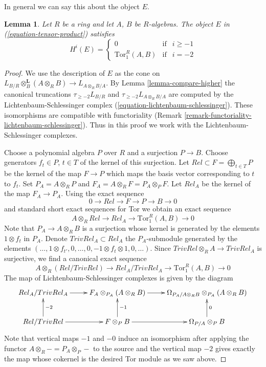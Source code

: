\documentclass{stacks-project}
\theoremstyle{plain}
\newtheorem{lemma}[subsection]{Lemma}
\theoremstyle{definition}
\theoremstyle{remark}
\numberwithin{equation}{subsection}
\begin{document}
\noindent
In general we can say this about the object $E$.

\begin{lemma}
\label{lemma-tensor-product}
Let $R$ be a ring and let $A$, $B$ be $R$-algebras. The object $E$
in (\ref{equation-tensor-product}) satisfies
$$
H^i(E) =
\left\{
\begin{matrix}
0 & \text{if} & i \geq -1 \\
\text{Tor}_1^R(A, B) & \text{if} & i = -2
\end{matrix}
\right.
$$
\end{lemma}

\begin{proof}
We use the description of $E$ as the cone on
$L_{B/R} \otimes_B^\mathbf{L} (A \otimes_R B) \to L_{A \otimes_R B/A}$.
By Lemma \ref{lemma-compare-higher} the canonical truncations
$\tau_{\geq -2}L_{B/R}$ and $\tau_{\geq -2}L_{A \otimes_R B/A}$
are computed by the Lichtenbaum-Schlessinger complex
(\ref{equation-lichtenbaum-schlessinger}).
These isomorphisms are compatible with functoriality
(Remark \ref{remark-functoriality-lichtenbaum-schlessinger}).
Thus in this proof we work with the Lichtenbaum-Schlessinger complexes.

\medskip\noindent
Choose a polynomial algebra $P$ over $R$ and a surjection $P \to B$.
Choose generators $f_t \in P$, $t \in T$ of the kernel of this surjection.
Let $Rel \subset F = \bigoplus_{t \in T} P$ be the kernel of the map
$F \to P$ which maps the basis vector corresponding to $t$ to $f_t$.
Set $P_A = A \otimes_R P$ and $F_A = A \otimes_R F = P_A \otimes_P F$.
Let $Rel_A$ be the kernel of the map $F_A \to P_A$. Using the exact sequence
$$
0 \to Rel \to F \to P \to B \to 0
$$
and standard short exact sequences for Tor we obtain an exact sequence
$$
A \otimes_R Rel \to Rel_A \to \text{Tor}_1^R(A, B) \to 0
$$
Note that $P_A \to A \otimes_R B$ is a surjection whose kernel is generated
by the elements $1 \otimes f_t$ in $P_A$. Denote $TrivRel_A \subset Rel_A$
the $P_A$-submodule generated by the elements
$(\ldots, 1 \otimes f_{t'}, 0, \ldots,
0, - 1 \otimes f_t \otimes 1, 0, \ldots)$.
Since $TrivRel \otimes_R A \to TrivRel_A$ is surjective, we find a
canonical exact sequence
$$
A \otimes_R (Rel/TrivRel) \to Rel_A/TrivRel_A \to \text{Tor}_1^R(A, B) \to 0
$$
The map of Lichtenbaum-Schlessinger complexes is given by the diagram
$$
\xymatrix{
Rel_A/TrivRel_A \ar[r] &
F_A \otimes_{P_A} (A \otimes_R B) \ar[r] &
\Omega_{P_A/A \otimes_R B} \otimes_{P_A} (A \otimes_R B) \\
Rel/TrivRel \ar[r] \ar[u]_{-2} &
F \otimes_P B \ar[r] \ar[u]_{-1} &
\Omega_{P/A} \otimes_P B \ar[u]_0
}
$$
Note that vertical maps $-1$ and $-0$ induce an isomorphism after applying
the functor $A \otimes_R - = P_A \otimes_P -$ to the source and the vertical
map $-2$ gives exactly the map whose cokernel is the desired Tor module
as we saw above.
\end{proof}
\end{document}
